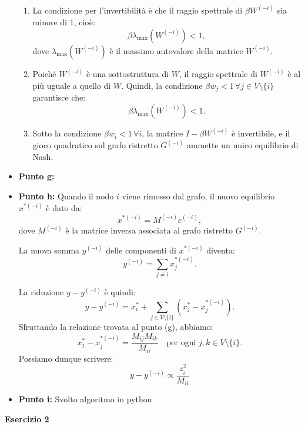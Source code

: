 \documentclass[a4paper,12pt]{article}
\begin{document}
\begin{itemize}
\begin{enumerate}
			\item {} La condizione per l'invertibilità è che il raggio spettrale di $\beta W^{(-i)}$ sia minore di 1, cioè:
			$$
			\beta \lambda_{\text{max}}(W^{(-i)}) < 1,
			$$
			dove $\lambda_{\text{max}}(W^{(-i)})$ è il massimo autovalore della matrice $W^{(-i)}$.
			
			\item {} Poiché $W^{(-i)}$ è una sottostruttura di $W$, il raggio spettrale di $W^{(-i)}$ è al più uguale a quello di $W$. Quindi, la condizione $\beta w_j < 1 \, \forall j \in V \setminus \{i\}$ garantisce che:
			$$
			\beta \lambda_{\text{max}}(W^{(-i)}) < 1.
			$$
			
			\item {} Sotto la condizione $\beta w_i < 1 \, \forall i$, la matrice $I - \beta W^{(-i)}$ è invertibile, e il gioco quadratico sul grafo ristretto $G^{(-i)}$ ammette un unico equilibrio di Nash.
		\end{enumerate}
		
		\item \textbf{Punto g: }
		\item \textbf{Punto h: }
		Quando il nodo $i$ viene rimosso dal grafo, il nuovo equilibrio $x^{*(-i)}$ è dato da:
		$$
		x^{*(-i)} = M^{(-i)} c^{(-i)},
		$$
		dove $M^{(-i)}$ è la matrice inversa associata al grafo ristretto $G^{(-i)}$. 
		
		La nuova somma $y^{(-i)}$ delle componenti di $x^{*(-i)}$ diventa:
		$$
		y^{(-i)} = \sum_{j \neq i} x_j^{*(-i)}.
		$$
		
		La riduzione $y - y^{(-i)}$ è quindi:
		$$
		y - y^{(-i)} = x_i^* + \sum_{j \in V \setminus \{i\}} \left(x_j^* - x_j^{*(-i)}\right).
		$$
		Sfruttando la relazione trovata al punto (g), abbiamo:
		\[
		x_j^* - x_j^{*(-i)} = \frac{M_{ij}M_{ik}}{M_{ii}} \quad \text{per ogni } j, k \in V \setminus \{i\}.
		\]
		Possiamo dunque scrivere:\\
		\[
		y - y^{(-i)} \propto \frac{z_i^2}{M_{ii}}
		\]
		
		\item \textbf{Punto i: }
		Svolto algoritmo in python
	\end{itemize}
	\centering \textbf{Esercizio 2}\\
\end{document}
